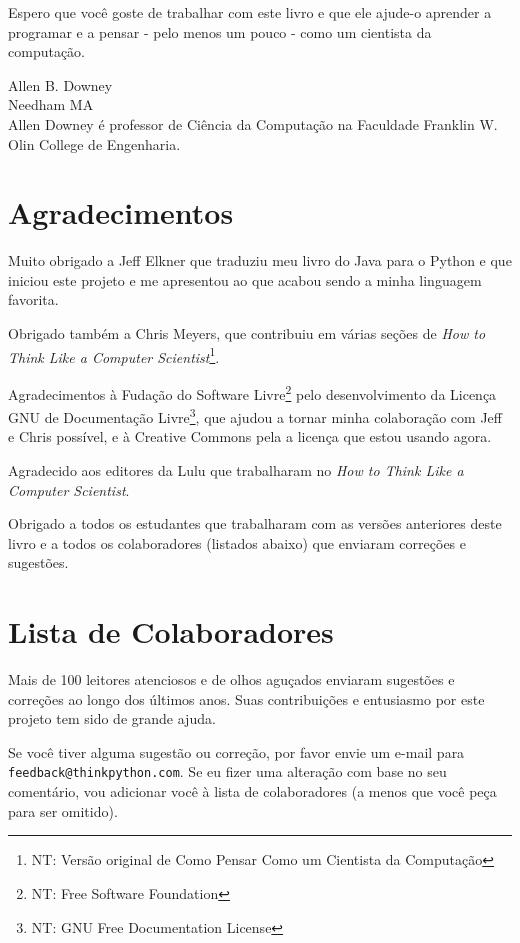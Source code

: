 \documentclass[10pt]{book}
\begin{document}
Espero que você goste de trabalhar com este livro e que ele ajude-o
aprender a programar e a pensar - pelo menos um pouco - como
um cientista da computação.


Allen B. Downey \\
Needham MA\\

Allen Downey é professor de Ciência da Computação na
Faculdade Franklin W. Olin College de Engenharia.


\section*{Agradecimentos}

Muito obrigado a Jeff Elkner que
traduziu meu livro do Java para o Python e que iniciou este
projeto e me apresentou ao que acabou sendo a minha
linguagem favorita.

Obrigado também a Chris Meyers, que contribuiu em várias seções
de {\em How to Think Like a Computer Scientist}\footnote{NT: Versão original de Como Pensar Como um Cientista da Computação}.

Agradecimentos à Fudação do Software Livre\footnote{NT: Free Software Foundation} pelo desenvolvimento
da Licença GNU de Documentação Livre\footnote{NT: GNU Free Documentation License}, que ajudou a tornar
minha colaboração com Jeff e Chris possível, e à Creative
Commons pela a licença que estou usando agora.

Agradecido aos editores da Lulu que trabalharam no
{\em How to Think Like a Computer Scientist}.

Obrigado a todos os estudantes que trabalharam com as versões
anteriores deste livro e a todos os colaboradores (listados
abaixo) que enviaram correções e sugestões.


\section*{Lista de Colaboradores}

Mais de 100 leitores atenciosos e de olhos aguçados enviaram
sugestões e correções ao longo dos últimos anos. Suas
contribuições e entusiasmo por este projeto tem sido de
grande ajuda.

Se você tiver alguma sugestão ou correção, por favor envie um e-mail para 
{\tt feedback@thinkpython.com}. Se eu fizer uma alteração com base no seu
comentário, vou adicionar você à lista de colaboradores
(a menos que você peça para ser omitido).
\end{document}
